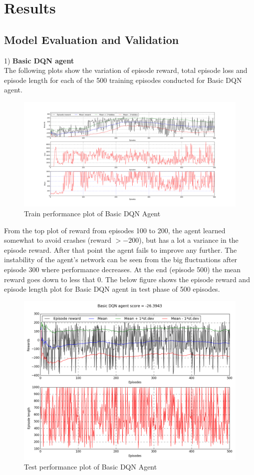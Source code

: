 \documentclass{article}
\begin{document}
\section{Results}
\subsection*{Model Evaluation and Validation}
1) \textbf{Basic DQN agent}\\
The following plots show the variation of episode reward, total episode loss and episode length for each of the 500 training episodes conducted for Basic DQN agent.
\begin{figure}[H]
	\caption{Train performance plot of Basic DQN Agent}
	\centering
	\includegraphics[width=15cm,trim={0 0 0 0},clip]{img/basicdqn_train}
\end{figure}
From the top plot of reward from episodes 100 to 200, the agent learned somewhat to avoid crashes (reward $> -200$), but has a lot a variance in the episode reward. After that point the agent fails to improve any further. The instability of the agent's network can be seen from the big fluctuations after episode 300 where performance decreases. At the end (episode 500) the mean reward goes down to less that 0.
The below figure shows the episode reward and episode length plot for Basic DQN agent in test phase of 500 episodes.
\begin{figure}[H]
	\caption{Test performance plot of Basic DQN Agent}
	\centering
	\includegraphics[width=13cm,trim={0 0 0 0},clip]{img/basicdqn}
\end{figure}
\end{document}
